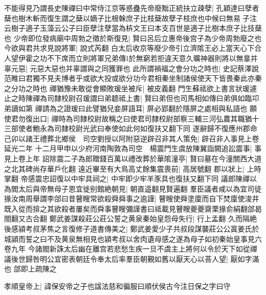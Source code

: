 不能得見乃謂長史陳禪曰中常侍江京等惑蠱先帝廢黜正統扶立疎孽|{
	孔穎達曰孽者蘖也樹木斬而復生謂之蘖以嫡子比根榦庶子比枝蘖故孽子枝庶也中候曰無易子注云樹子適子玉藻云公子曰臣孽注孽當為枿文王曰本支百世是適子比樹本庶子比技蘖也}
少帝即位發病廟中周勃之徵於斯復見|{
	賢曰呂后立惠帝後宫子為少帝周勃廢之也}
今欲與君共求見說將軍|{
	說式芮翻}
白太后收京等廢少帝引立濟隂王必上當天心下合人望伊霍之功不下席而立則將軍兄弟傳於無窮若拒違天意久曠神器則將以無辠并辜元惡|{
	元惡大惡也并辜謂與之同獲罪也}
此所謂禍福之會分功之時也|{
	史記蔡澤說范睢曰君獨不見夫博者乎或欲大投或欲分功今君相秦坐制諸侯使天下皆畏秦此亦秦之分功之時也}
禪猶豫未敢從會顯敗瑗坐被斥|{
	被皮義翻}
門生蘇祗欲上書言狀瑗遽止之時陳禪為司隸校尉召瑗謂曰弟聼祗上書|{
	賢曰弟但也司馬相如傳曰弟俱如臨卭弟讀如第}
禪請為之證瑗曰此譬猶兒妾屏語耳|{
	屏必郢翻於隱屏之處相與私語也}
願使君勿復出口|{
	禪時為司隸校尉故稱之曰使君司隸校尉部察三輔三河弘農其職猶十三部使者鮑永為司隸校尉光武曰奉使如此何如復扶又翻下同}
遂辭歸不復應州郡命　己卯以諸王禮葬北鄉侯　司空劉授以阿附惡逆辟召非其人策免|{
	辟召非人事見上卷延光二年}
十二月甲申以少府河南陶敦為司空　楊震門生虞放陳翼詣闕追訟震事|{
	事見上卷上年}
詔除震二子為郎贈錢百萬以禮改葬於華隂潼亭|{
	賢曰墓在今潼關西大道之北其碑尚存華戶化翻}
遠近畢至有大鳥高丈餘集震喪前|{
	高居號翻}
郡以狀上|{
	上時掌翻}
帝感震忠詔復以中牢具祠之|{
	中牢即少牢羊豕具也復扶又翻下同}
議郎陳禪以為閻太后與帝無母子恩宜徙别館絶朝見|{
	朝直遥翻見賢遍翻}
羣臣議者咸以為宜司徒掾汝南周舉謂李郃曰昔瞽瞍常欲殺舜舜事之逾謹|{
	瞽瞍使舜塗廩而自下焚廩使浚井既入從而揜之其欲殺者屢矣而舜事瞽瞍彌謹書曰祗載見瞽瞍夔夔齋栗掾俞絹翻郃曷閤翻又古合翻}
鄭武姜謀殺莊公莊公誓之黄泉秦始皇怨母失行|{
	行上孟翻}
久而隔絶後感潁考叔茅焦之言復修子道書傳美之|{
	鄭武姜愛少子共叔段謀襲莊公公寘姜氏於城潁而誓之曰不及黄泉無相見也潁考叔以舍肉遺母感之遂為母子如初秦始皇事見六卷九年}
今諸閻新誅太后幽在離宫若悲愁生疾一旦不虞主上將何以令於天下如從禪議後世歸咎明公宜密表朝廷令奉太后率羣臣朝覲如舊以厭天心以荅人望|{
	厭如字滿也}
郃即上疏陳之

孝順皇帝上|{
	諱保安帝之子也諡法慈和徧服曰順伏侯古今注日保之字曰守}


